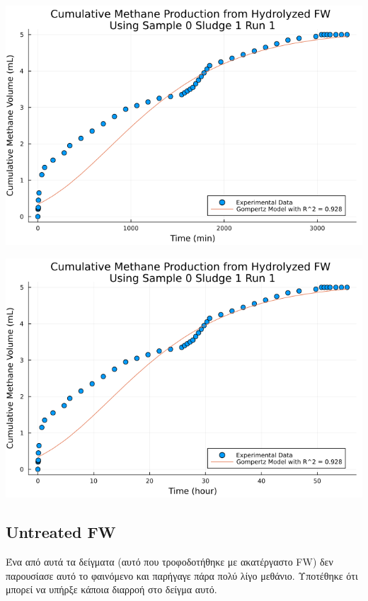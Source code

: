 \documentclass[11pt]{article}
\begin{document}
\begin{center}
\includegraphics[width=.9\linewidth]{../plots/BMPs/Hydrolyzed FW/methane_kinetics_hydrolysate_0_s1_r1_min.png}
\end{center}

\begin{center}
\includegraphics[width=.9\linewidth]{../plots/BMPs/Hydrolyzed FW/methane_kinetics_hydrolysate_0_s1_r1_hour.png}
\end{center}

\subsection{Untreated FW}
\label{sec:orgdc1293a}
Ένα από αυτά τα δείγματα (αυτό που τροφοδοτήθηκε με ακατέργαστο FW) δεν παρουσίασε αυτό το φαινόμενο και παρήγαγε πάρα πολύ λίγο μεθάνιο. Υποτέθηκε ότι μπορεί να υπήρξε κάποια διαρροή στο δείγμα αυτό.
\end{document}
